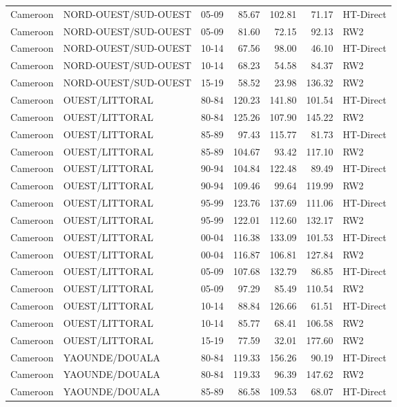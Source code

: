 \begin{longtable}{lllrrrl}
  Cameroon & NORD-OUEST/SUD-OUEST & 05-09 & 85.67 & 102.81 & 71.17 & HT-Direct \\ 
  Cameroon & NORD-OUEST/SUD-OUEST & 05-09 & 81.60 & 72.15 & 92.13 & RW2 \\ 
  Cameroon & NORD-OUEST/SUD-OUEST & 10-14 & 67.56 & 98.00 & 46.10 & HT-Direct \\ 
  Cameroon & NORD-OUEST/SUD-OUEST & 10-14 & 68.23 & 54.58 & 84.37 & RW2 \\ 
  Cameroon & NORD-OUEST/SUD-OUEST & 15-19 & 58.52 & 23.98 & 136.32 & RW2 \\ 
  Cameroon & OUEST/LITTORAL & 80-84 & 120.23 & 141.80 & 101.54 & HT-Direct \\ 
  Cameroon & OUEST/LITTORAL & 80-84 & 125.26 & 107.90 & 145.22 & RW2 \\ 
  Cameroon & OUEST/LITTORAL & 85-89 & 97.43 & 115.77 & 81.73 & HT-Direct \\ 
  Cameroon & OUEST/LITTORAL & 85-89 & 104.67 & 93.42 & 117.10 & RW2 \\ 
  Cameroon & OUEST/LITTORAL & 90-94 & 104.84 & 122.48 & 89.49 & HT-Direct \\ 
  Cameroon & OUEST/LITTORAL & 90-94 & 109.46 & 99.64 & 119.99 & RW2 \\ 
  Cameroon & OUEST/LITTORAL & 95-99 & 123.76 & 137.69 & 111.06 & HT-Direct \\ 
  Cameroon & OUEST/LITTORAL & 95-99 & 122.01 & 112.60 & 132.17 & RW2 \\ 
  Cameroon & OUEST/LITTORAL & 00-04 & 116.38 & 133.09 & 101.53 & HT-Direct \\ 
  Cameroon & OUEST/LITTORAL & 00-04 & 116.87 & 106.81 & 127.84 & RW2 \\ 
  Cameroon & OUEST/LITTORAL & 05-09 & 107.68 & 132.79 & 86.85 & HT-Direct \\ 
  Cameroon & OUEST/LITTORAL & 05-09 & 97.29 & 85.49 & 110.54 & RW2 \\ 
  Cameroon & OUEST/LITTORAL & 10-14 & 88.84 & 126.66 & 61.51 & HT-Direct \\ 
  Cameroon & OUEST/LITTORAL & 10-14 & 85.77 & 68.41 & 106.58 & RW2 \\ 
  Cameroon & OUEST/LITTORAL & 15-19 & 77.59 & 32.01 & 177.60 & RW2 \\ 
  Cameroon & YAOUNDE/DOUALA & 80-84 & 119.33 & 156.26 & 90.19 & HT-Direct \\ 
  Cameroon & YAOUNDE/DOUALA & 80-84 & 119.33 & 96.39 & 147.62 & RW2 \\ 
  Cameroon & YAOUNDE/DOUALA & 85-89 & 86.58 & 109.53 & 68.07 & HT-Direct \\ 

\end{longtable}
